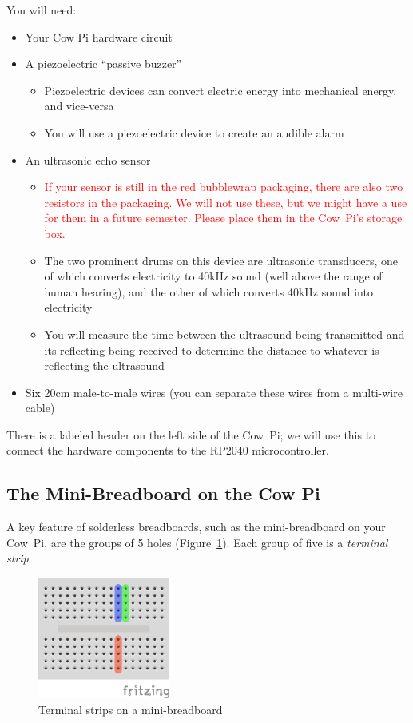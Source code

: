 You will need:
\begin{itemize}
    \item Your Cow Pi hardware circuit
    \item A piezoelectric ``passive buzzer''
    \begin{itemize}
        \item Piezoelectric devices can convert electric energy into mechanical energy, and vice-versa
        \item You will use a piezoelectric device to create an audible alarm
    \end{itemize}
    \item An ultrasonic echo sensor
    \begin{itemize}
        \item \textcolor{red}{If your sensor is still in the red bubblewrap packaging, there are also two resistors in the packaging. We will not use these, but we might have a use for them in a future semester. Please place them in the Cow~Pi's storage box.}
        \item The two prominent drums on this device are ultrasonic transducers, one of which converts electricity to 40kHz sound (well above the range of human hearing), and the other of which converts 40kHz sound into electricity
        \item You will measure the time between the ultrasound being transmitted and its reflecting being received to determine the distance to whatever is reflecting the ultrasound
    \end{itemize}
    \item Six 20cm male-to-male wires (you can separate these wires from a multi-wire cable)
\end{itemize}

There is a labeled header on the left side of the Cow~Pi;
we will use this to connect the hardware components to the RP2040 microcontroller.

\subsection{The Mini-Breadboard on the Cow Pi}

A key feature of solderless breadboards, such as the mini-breadboard on your Cow~Pi, are the groups of 5 holes (Figure~\ref{fig:breadboard-mk4b}).
Each group of five is a \textit{terminal strip}.

\begin{figure}
    \centering
    \includegraphics[height=4cm]{hardware/mk4b/breadboard}
    \caption{Terminal strips on a mini-breadboard \label{fig:breadboard-mk4b}}
\end{figure}

